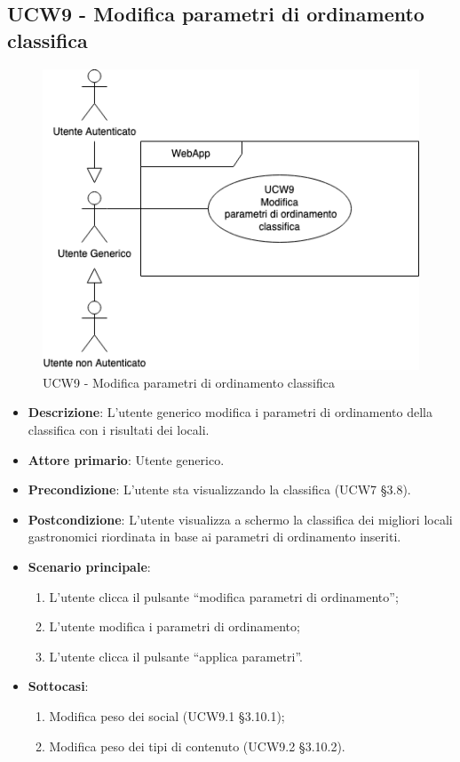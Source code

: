 \subsection{UCW9 - Modifica parametri di ordinamento classifica}
\begin{figure}[!h]
\centering
    \includegraphics[scale=0.5]{UC_images/UCW9.png}
    \caption{UCW9 - Modifica parametri di ordinamento classifica}
\end{figure}
\begin{itemize}
	\item \textbf{Descrizione}: L'utente generico modifica i parametri di ordinamento della classifica con i risultati dei locali.
    \item \textbf{Attore primario}: Utente generico.
    \item \textbf{Precondizione}: L’utente sta visualizzando la classifica (UCW7 §3.8).
    \item \textbf{Postcondizione}: L’utente visualizza a schermo la classifica dei migliori locali gastronomici riordinata in base ai parametri di ordinamento inseriti.
    \item \textbf{Scenario principale}: 
    \begin{enumerate}
        \item L’utente clicca il pulsante “modifica parametri di ordinamento”;
        \item L’utente modifica i parametri di ordinamento;
        \item L’utente clicca il pulsante “applica parametri”.
    \end{enumerate}

    \item \textbf{Sottocasi}:
    \begin{enumerate}
        \item Modifica peso dei social (UCW9.1 §3.10.1);
        \item Modifica peso dei tipi di contenuto (UCW9.2 §3.10.2).
    \end{enumerate}

\end{itemize}

